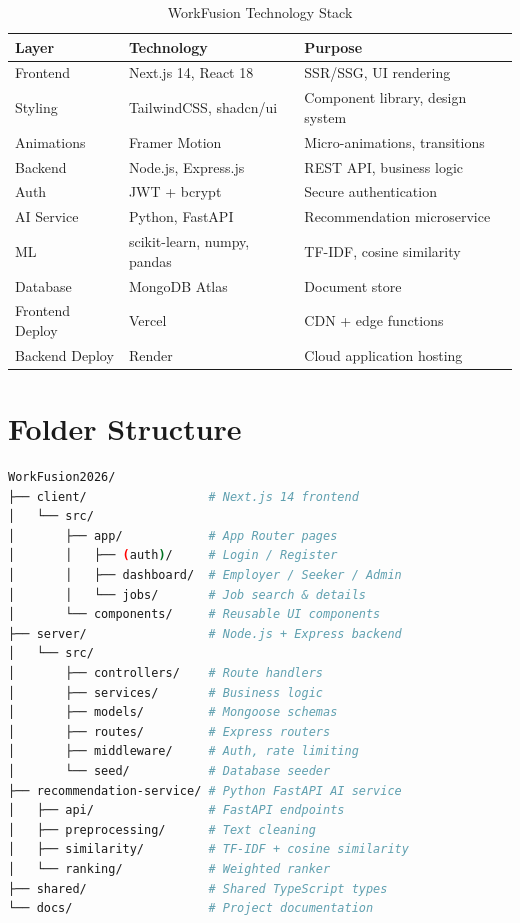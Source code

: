 \documentclass[12pt,a4paper,oneside]{report}
\begin{document}
\begin{table}[H]
  \centering
  \caption{WorkFusion Technology Stack}
  \label{tab:tech-stack}
  \begin{tabularx}{\textwidth}{llX}
    \toprule
    \textbf{Layer} & \textbf{Technology} & \textbf{Purpose} \\
    \midrule
    Frontend    & Next.js 14, React 18  & SSR/SSG, UI rendering \\
    Styling     & TailwindCSS, shadcn/ui & Component library, design system \\
    Animations  & Framer Motion         & Micro-animations, transitions \\
    Backend     & Node.js, Express.js   & REST API, business logic \\
    Auth        & JWT + bcrypt          & Secure authentication \\
    AI Service  & Python, FastAPI       & Recommendation microservice \\
    ML          & scikit-learn, numpy, pandas & TF-IDF, cosine similarity \\
    Database    & MongoDB Atlas         & Document store \\
    Frontend Deploy & Vercel            & CDN + edge functions \\
    Backend Deploy  & Render            & Cloud application hosting \\
    \bottomrule
  \end{tabularx}
\end{table}

\section{Folder Structure}

\begin{lstlisting}[language=bash,caption=WorkFusion Monorepo Folder Structure]
WorkFusion2026/
├── client/                 # Next.js 14 frontend
│   └── src/
│       ├── app/            # App Router pages
│       │   ├── (auth)/     # Login / Register
│       │   ├── dashboard/  # Employer / Seeker / Admin
│       │   └── jobs/       # Job search & details
│       └── components/     # Reusable UI components
├── server/                 # Node.js + Express backend
│   └── src/
│       ├── controllers/    # Route handlers
│       ├── services/       # Business logic
│       ├── models/         # Mongoose schemas
│       ├── routes/         # Express routers
│       ├── middleware/     # Auth, rate limiting
│       └── seed/           # Database seeder
├── recommendation-service/ # Python FastAPI AI service
│   ├── api/                # FastAPI endpoints
│   ├── preprocessing/      # Text cleaning
│   ├── similarity/         # TF-IDF + cosine similarity
│   └── ranking/            # Weighted ranker
├── shared/                 # Shared TypeScript types
└── docs/                   # Project documentation
\end{lstlisting}
\end{document}
